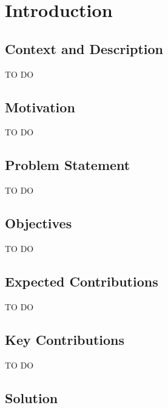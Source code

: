 

\chapter{Introduction}
\label{cha:introduction}

\section{Context and Description}
\label{sec:context}

TO DO

\section{Motivation}
\label{sec:motivation}

TO DO

\section{Problem Statement}
\label{sec:problem_statement}

TO DO

\section{Objectives}
\label{sec:objectives}

TO DO

\section{Expected Contributions}
\label{sec:expected_contributions}

TO DO

\section{Key Contributions}
\label{sec:key_contributions}

TO DO

\section{Solution}
\label{sec:solution}

